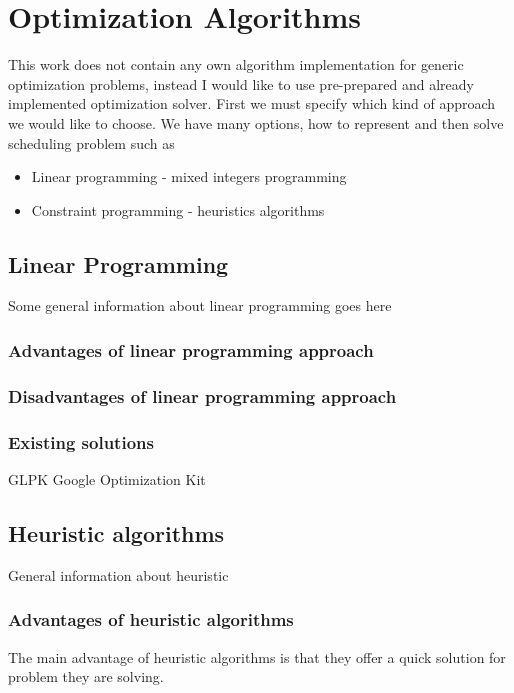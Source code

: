 
\section{Optimization Algorithms}\label{sec:optimization-algorithms}

This work does not contain any own algorithm implementation for generic optimization problems,
instead I would like to use pre-prepared and already implemented optimization solver.
First we must specify which kind of approach we would like to choose.
We have many options, how to represent and then solve scheduling problem such as
\begin{itemize}
    \item Linear programming - mixed integers programming
    \item Constraint programming - heuristics algorithms
\end{itemize}

\subsection{Linear Programming}\label{subsec:linear-programming}
Some general information about linear programming goes here %

\subsubsection{Advantages of linear programming approach}

\subsubsection{Disadvantages of linear programming approach}

\subsubsection{Existing solutions}\label{subsec:existing-solutions-lin}
GLPK
Google Optimization Kit

\subsection{Heuristic algorithms}\label{subsec:heuristic-algorithms}
General information about heuristic %

\subsubsection{Advantages of heuristic algorithms}
The main advantage of heuristic algorithms is that they offer a quick solution for problem they are solving.

